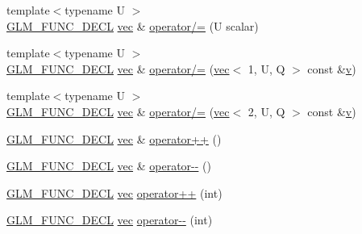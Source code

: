 \begin{DoxyCompactItemize}
\item 
{\footnotesize template$<$typename U $>$ }\\\mbox{\hyperlink{setup_8hpp_ab2d052de21a70539923e9bcbf6e83a51}{G\+L\+M\+\_\+\+F\+U\+N\+C\+\_\+\+D\+E\+CL}} \mbox{\hyperlink{structglm_1_1vec}{vec}} \& \mbox{\hyperlink{structglm_1_1vec_3_012_00_01_t_00_01_q_01_4_aa8482a8ff3984a1cb04caf5e3e684f71}{operator/=}} (U scalar)
\item 
{\footnotesize template$<$typename U $>$ }\\\mbox{\hyperlink{setup_8hpp_ab2d052de21a70539923e9bcbf6e83a51}{G\+L\+M\+\_\+\+F\+U\+N\+C\+\_\+\+D\+E\+CL}} \mbox{\hyperlink{structglm_1_1vec}{vec}} \& \mbox{\hyperlink{structglm_1_1vec_3_012_00_01_t_00_01_q_01_4_ac08ebb38eeef819015ce62bf46fd1a8f}{operator/=}} (\mbox{\hyperlink{structglm_1_1vec}{vec}}$<$ 1, U, Q $>$ const \&\mbox{\hyperlink{_s_d_l__opengl_8h_a10a82eabcb59d2fcd74acee063775f90}{v}})
\item 
{\footnotesize template$<$typename U $>$ }\\\mbox{\hyperlink{setup_8hpp_ab2d052de21a70539923e9bcbf6e83a51}{G\+L\+M\+\_\+\+F\+U\+N\+C\+\_\+\+D\+E\+CL}} \mbox{\hyperlink{structglm_1_1vec}{vec}} \& \mbox{\hyperlink{structglm_1_1vec_3_012_00_01_t_00_01_q_01_4_a5c779bb132a97e91d6d8180a9c3fe31d}{operator/=}} (\mbox{\hyperlink{structglm_1_1vec}{vec}}$<$ 2, U, Q $>$ const \&\mbox{\hyperlink{_s_d_l__opengl_8h_a10a82eabcb59d2fcd74acee063775f90}{v}})
\item 
\mbox{\hyperlink{setup_8hpp_ab2d052de21a70539923e9bcbf6e83a51}{G\+L\+M\+\_\+\+F\+U\+N\+C\+\_\+\+D\+E\+CL}} \mbox{\hyperlink{structglm_1_1vec}{vec}} \& \mbox{\hyperlink{structglm_1_1vec_3_012_00_01_t_00_01_q_01_4_a3b86debb295909f1369aebf4b9a834ab}{operator++}} ()
\item 
\mbox{\hyperlink{setup_8hpp_ab2d052de21a70539923e9bcbf6e83a51}{G\+L\+M\+\_\+\+F\+U\+N\+C\+\_\+\+D\+E\+CL}} \mbox{\hyperlink{structglm_1_1vec}{vec}} \& \mbox{\hyperlink{structglm_1_1vec_3_012_00_01_t_00_01_q_01_4_a213bf05d1d3abd8ed5da4908cd3dfdd7}{operator-\/-\/}} ()
\item 
\mbox{\hyperlink{setup_8hpp_ab2d052de21a70539923e9bcbf6e83a51}{G\+L\+M\+\_\+\+F\+U\+N\+C\+\_\+\+D\+E\+CL}} \mbox{\hyperlink{structglm_1_1vec}{vec}} \mbox{\hyperlink{structglm_1_1vec_3_012_00_01_t_00_01_q_01_4_ab6bd7fc778f3585723da44341d9d5c37}{operator++}} (int)
\item 
\mbox{\hyperlink{setup_8hpp_ab2d052de21a70539923e9bcbf6e83a51}{G\+L\+M\+\_\+\+F\+U\+N\+C\+\_\+\+D\+E\+CL}} \mbox{\hyperlink{structglm_1_1vec}{vec}} \mbox{\hyperlink{structglm_1_1vec_3_012_00_01_t_00_01_q_01_4_a6017c4f43c83945ca60837ec727f4c43}{operator-\/-\/}} (int)

\end{DoxyCompactItemize}
